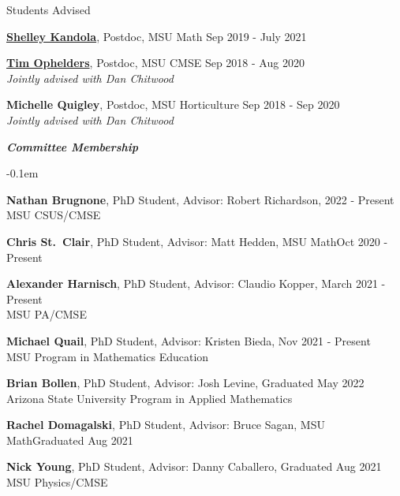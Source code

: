 \documentclass{resume} %
\begin{document}
\begin{rSection}{Students Advised}
\begin{list}{}{\leftmargin=1em}
   \item \textbf{\href{www.shelleykandola.com}{Shelley Kandola}}, Postdoc, MSU Math \hfill Sep 2019 - July 2021

   \item \textbf{\href{https://research.tue.nl/en/persons/tim-ae-ophelders}{Tim Ophelders}}, Postdoc, MSU CMSE \hfill Sep 2018 - Aug 2020\\
   \phantom{XXX} \textit{Jointly advised with Dan Chitwood}
   \item \textbf{Michelle Quigley}, Postdoc, MSU Horticulture \hfill Sep 2018 - Sep 2020\\
   \phantom{XXX} \textit{Jointly advised with Dan Chitwood}
\end{list}

\textbf{\textit{Committee Membership}}
\begin{list}{}{\leftmargin=1em}
   \itemsep -0.1em %






   \item \textbf{Nathan Brugnone}, PhD Student, Advisor: Robert Richardson, \hfill  2022 - Present\\
   \phantom{xxx}MSU CSUS/CMSE 
   \item \textbf{Chris St.~Clair}, PhD Student, Advisor: Matt Hedden, MSU Math\hfill Oct 2020 - Present
   \item \textbf{Alexander Harnisch}, PhD Student, Advisor: Claudio Kopper, \hfill March 2021 - Present\\
   \phantom{xxx} MSU PA/CMSE
   \item \textbf{Michael Quail}, PhD Student, Advisor: Kristen Bieda, \hfill Nov 2021 - Present\\
   \phantom{xxx} MSU Program in Mathematics Education
    \item \textbf{Brian Bollen}, PhD Student, Advisor: Josh Levine, \hfill Graduated May 2022\\
    \phantom{xxx}Arizona State University Program in Applied Mathematics
   \item \textbf{Rachel Domagalski}, PhD Student, Advisor: Bruce Sagan, MSU Math\hfill Graduated Aug 2021
   \item \textbf{Nick Young}, PhD Student, Advisor: Danny Caballero, \hfill Graduated Aug 2021\\
   \phantom{xxx}MSU Physics/CMSE


\end{list}
\end{rSection}
\end{document}
